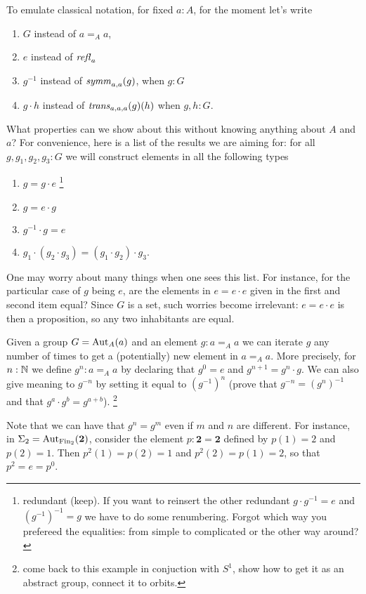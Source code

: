  To emulate classical notation, for fixed $a:A$,  for the moment let's write
 \begin{enumerate}
 \item $G$ instead of $a=_Aa$,
 \item $e$ instead of $\mathop{{\it refl}_{a}}{}$
 \item $g^{-1}$ instead of $\mathop{\mathit{symm}}_{a,a}(g)$, when $g:G$
 \item $g\cdot h$ instead of $\mathop{\mathit{trans}}_{a,a,a}(g)(h)$ when $g,h:G$.
 \end{enumerate}
 What properties can we show about this without knowing anything about $A$ and $a$? For convenience, here is a list of the results we are aiming for: for all $g,g_1,g_2,g_3:G$ we will construct elements in all the following types
 \begin{enumerate}
 \item $g=g\cdot e$ \footnote{redundant (keep).  If you want to reinsert the other redundant $g\cdot g^{-1}=e$ and $(g^{-1})^{-1}=g$ we have to do some renumbering.  Forgot which way you prefereed the equalities: from simple to complicated or the other way around?}
 \item $g=e\cdot g$
 \item $g^{-1}\cdot g=e$
 \item $g_1\cdot(g_2\cdot g_3)=(g_1\cdot g_2)\cdot g_3$.
 \end{enumerate}
 \begin{remark}
   One may worry about many things when one sees this list.  For instance, for the particular case of $g$ being $e$, are the elements in $e=e\cdot e$ given in the first and second item equal?  Since $G$ is a set, such worries become irrelevant: $e=e\cdot e$ is then a proposition, so any two inhabitants are equal.
 \end{remark}
 \begin{example}\label{ex:orbitofanelement}
   Given a group $G=\mathrm{Aut}_A(a)$ and an element $g: a=_Aa$ we can iterate $g$ any number of times to get a (potentially) new element in $a=_Aa$. More precisely, for $n:\mathbb{N}$ we define $g^n:a=_Aa$ by declaring that $g^0=e$ and $g^{n+1}=g^n\cdot g$.  We can also give meaning to $g^{-n}$ by setting it equal to $(g^{-1})^n$ (prove that $g^{-n}=(g^n)^{-1}$ and that $g^a\cdot g^b=g^{a+b}$).  \footnote{come back to this example in conjuction with $S^1$, show how to get it as an abstract group, connect it to orbits.}

Note that we can have that $g^n=g^m$ even if $m$ and $n$ are different.  For instance, in $\Sigma_2=\mathrm{Aut}_{\mathrm{Fin}_2}(\mathbf 2)$, consider the element $p:\mathbf 2=\mathbf 2$ defined by $p(1)=2$ and $p(2)=1$.  Then $p^2(1)=p(2)=1$ and $p^2(2)=p(1)=2$, so that $p^2=e=p^0$.
   \end{example}
